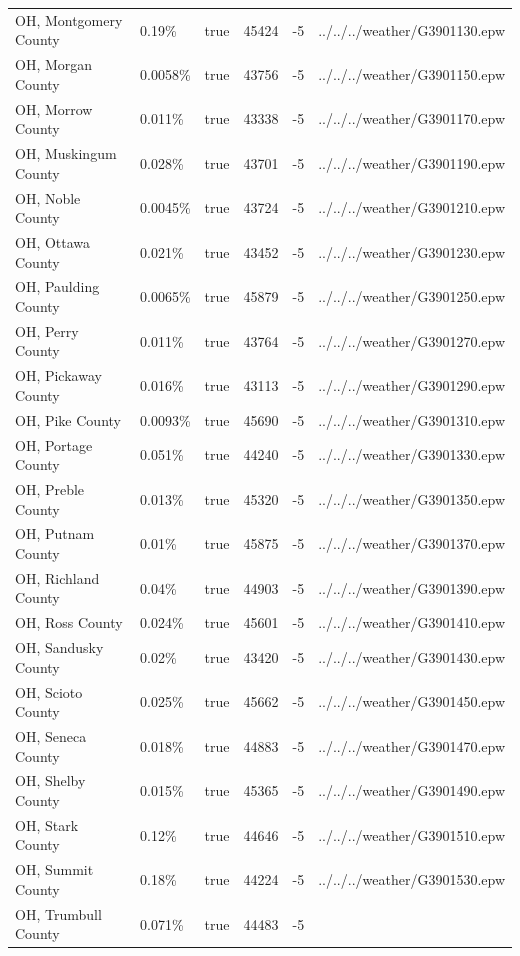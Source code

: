 \begin{longtable}[]{@{}llllll@{}}
OH, Montgomery County & 0.19\% & true & 45424 & -5 &
../../../weather/G3901130.epw \\
OH, Morgan County & 0.0058\% & true & 43756 & -5 &
../../../weather/G3901150.epw \\
OH, Morrow County & 0.011\% & true & 43338 & -5 &
../../../weather/G3901170.epw \\
OH, Muskingum County & 0.028\% & true & 43701 & -5 &
../../../weather/G3901190.epw \\
OH, Noble County & 0.0045\% & true & 43724 & -5 &
../../../weather/G3901210.epw \\
OH, Ottawa County & 0.021\% & true & 43452 & -5 &
../../../weather/G3901230.epw \\
OH, Paulding County & 0.0065\% & true & 45879 & -5 &
../../../weather/G3901250.epw \\
OH, Perry County & 0.011\% & true & 43764 & -5 &
../../../weather/G3901270.epw \\
OH, Pickaway County & 0.016\% & true & 43113 & -5 &
../../../weather/G3901290.epw \\
OH, Pike County & 0.0093\% & true & 45690 & -5 &
../../../weather/G3901310.epw \\
OH, Portage County & 0.051\% & true & 44240 & -5 &
../../../weather/G3901330.epw \\
OH, Preble County & 0.013\% & true & 45320 & -5 &
../../../weather/G3901350.epw \\
OH, Putnam County & 0.01\% & true & 45875 & -5 &
../../../weather/G3901370.epw \\
OH, Richland County & 0.04\% & true & 44903 & -5 &
../../../weather/G3901390.epw \\
OH, Ross County & 0.024\% & true & 45601 & -5 &
../../../weather/G3901410.epw \\
OH, Sandusky County & 0.02\% & true & 43420 & -5 &
../../../weather/G3901430.epw \\
OH, Scioto County & 0.025\% & true & 45662 & -5 &
../../../weather/G3901450.epw \\
OH, Seneca County & 0.018\% & true & 44883 & -5 &
../../../weather/G3901470.epw \\
OH, Shelby County & 0.015\% & true & 45365 & -5 &
../../../weather/G3901490.epw \\
OH, Stark County & 0.12\% & true & 44646 & -5 &
../../../weather/G3901510.epw \\
OH, Summit County & 0.18\% & true & 44224 & -5 &
../../../weather/G3901530.epw \\
OH, Trumbull County & 0.071\% & true & 44483 & -5 &

\end{longtable}
